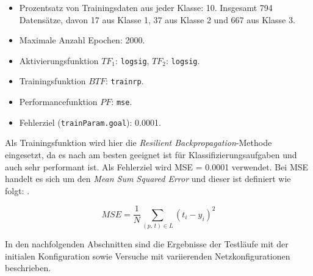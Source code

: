 \begin{itemize}
  \item Prozentsatz von Trainingsdaten aus jeder Klasse: 10. Insgesamt 794 
  Datensätze, davon 17 aus Klasse 1, 37 aus Klasse 2 und 667 aus Klasse 3.
  \item Maximale Anzahl Epochen: 2000.
  \item Aktivierungsfunktion $TF_1$: \texttt{logsig}, $TF_2$: \texttt{logsig}.
  \item Trainingsfunktion $BTF$: \texttt{trainrp}.
  \item Performancefunktion $PF$: \texttt{mse}.
  \item Fehlerziel (\texttt{trainParam.goal}): 0.0001.
\end{itemize}

Als Trainingsfunktion wird hier die \textsl{Resilient Backpropagation}-Methode 
eingesetzt, da es nach \cite{Demuth1998} am besten geeignet ist für 
Klassifizierungsaufgaben und auch sehr performant ist. Als Fehlerziel wird MSE =
0.0001 verwendet. Bei MSE handelt es sich um den \emph{Mean Sum Squared Error}
und dieser ist definiert wie folgt: \cite[Kapitel 5]{bittel2007}.

\[
MSE = \frac{1}{N} \sum_{(p,\,t) \in L} (t_i - y_i)^2
\]

In den nachfolgenden Abschnitten sind die Ergebnisse der Testläufe mit der 
initialen Konfiguration sowie Versuche mit variierenden Netzkonfigurationen 
beschrieben.
